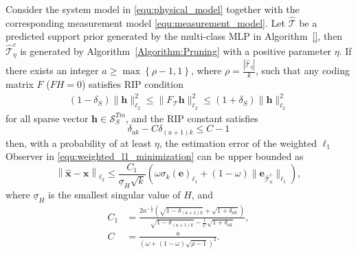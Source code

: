 \begin{theorem}\label{Thm:recovery_Withpruning}
Consider the system model in \eqref{equ:physical_model} together with the corresponding measurement model \eqref{equ:measurement_model}. Let $\hat{\mathcal{T}}$ be a predicted support prior generated by the multi-class MLP in Algorithm~\ref{}, then $\hat{\mathcal{T}}_{\eta}^c$ is generated by Algorithm~\ref{Algorithm:Pruning} with a positive parameter $\eta$. If there exists an integer $a\geq \max\left\{\rho-1,1\right\}$, where $\rho = \frac{|\hat{\mathcal{T}}_{\eta}|}{k}$, such that any coding matrix $F$ ($FH=0$) satisfies RIP condition
\begin{align}\label{equ: RIP}
   (1-\delta_{S})\|\mathbf{h}\|_{\ell_2}^2 \leq \|F_\mathcal{T}\mathbf{h}\|_{\ell_2}^2 \leq (1+\delta_{S})\|\mathbf{h}\|_{\ell_2}^2 
 \end{align}
for all sparse vector $\mathbf{h} \in \mathcal{S}^{Tm}_{S}$, and the RIP constant satisfies
\begin{equation}
    \delta_{ak}-C\delta_{(a+1)k} \leq C-1
\end{equation} 
then, with a probability of at least $\eta$, the estimation error of the weighted $\ell_1$ Observer in \eqref{equ:weighted_l1_minimization} can be upper bounded as
\begin{equation} \label{equ:error_bound3}
    \left\|\hat{\mathbf{x}}-\mathbf{x}\right\|_{\ell_2} \leq 
   \frac{C_{1}}{\underline{\sigma}_H\sqrt{k}}\left(\omega\sigma_k(\mathbf{e})_{\ell_1}+(1-\omega)\|\mathbf{e}_{\hat{\mathcal{T}}_{\eta}^c} \|_{\ell_1}\right),
\end{equation}
where $\underline{\sigma}_H$ is the smallest singular value of $H$, and 
$$\begin{aligned} C_1 &= \frac{2a^{-\frac{1}{2}}(\sqrt{1-\delta_{(a+1)k}}+\sqrt{1+\delta_{a k}})}{\sqrt{1-\delta_{(a+1)k}}-\frac{1}{C}\sqrt{1+\delta_{a k}}}, \\  C &= \frac{a}{(\omega+(1-\omega)\sqrt{\rho -1})^2}.
\end{aligned}$$
\end{theorem}
\fi

